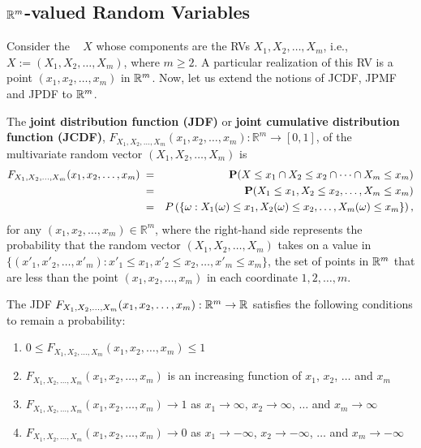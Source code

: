\subsection{$\mathbb{R}^m$-valued Random Variables}\label{S:Rm-valuedRVs}

Consider the \rv~ $X$ whose components are the RVs $X_1,X_2,\ldots,X_m$, i.e., $X := (X_1,X_2,\ldots,X_m)$, where $m \geq 2$.  
A particular realization of this RV is a point $(x_1,x_2,\ldots,x_m)$ in $\mathbb{R}^m$.  
Now, let us extend the notions of JCDF, JPMF and JPDF to $\mathbb{R}^m$.  

\begin{definition}\label{Df:JmDF}
The {\bf joint distribution function (JDF)} or {\bf joint cumulative distribution function (JCDF)}, $F_{X_1,X_2,\ldots,X_m}(x_1,x_2,\ldots,x_m):\mathbb{R}^m\to [0,1]$, of the multivariate random vector $(X_1,X_2,\ldots,X_m)$ is
\begin{eqnarray}\label{E:jmDF}
F_{X_1,X_2,\ldots,X_m}(x_1,x_2,\ldots,x_m)\; 
&=& \mathbf{P}(X\leq x_1 \cap X_2 \leq x_2 \cap \cdots \cap X_m \leq x_m)\notag\\ 
&=& \mathbf{P}(X_1\leq x_1 , X_2 \leq x_2, \ldots, X_m \leq x_m)\\
&=& P\left( \{ \omega: X_1(\omega) \leq x_1, X_2(\omega) \leq x_2, \ldots, X_m(\omega) \leq x_m \} \right), \notag
\end{eqnarray}
for any $(x_1,x_2,\ldots,x_m) \in \mathbb{R}^m$, 
where the right-hand side represents the probability that the random vector $(X_1,X_2,\ldots,X_m)$ takes on a value in 
$\{(x'_1,x'_2,\ldots,x'_m): x'_1 \leq x_1, x'_2 \leq x_2, \ldots, x'_m \leq x_m\}$, the set of points in $\mathbb{R}^m$ that are less than the point $(x_1,x_2,\ldots,x_m)$ in each coordinate $1,2,\ldots,m$.
\end{definition}

The JDF $F_{X_1,X_2,\ldots,X_m}(x_1,x_2,\ldots,x_m):\mathbb{R}^m\to\mathbb{R}$ satisfies the following conditions to remain a probability: 
\begin{enumerate}
\item $0 \leq F_{X_1,X_2,\ldots,X_m}(x_1,x_2,\ldots,x_m) \leq 1$
\item $F_{X_1,X_2,\ldots,X_m}(x_1,x_2,\ldots,x_m)$ is an increasing function of $x_1$, $x_2$, $\ldots$ and $x_m$
\item $F_{X_1,X_2,\ldots,X_m}(x_1,x_2,\ldots,x_m) \to 1$ as $x_1\to \infty$, $x_2\to \infty$, $\ldots$ and $x_m\to \infty$
\item $F_{X_1,X_2,\ldots,X_m}(x_1,x_2,\ldots,x_m) \to 0$ as $x_1\to -\infty$, $x_2\to -\infty$, $\ldots$ and $x_m\to -\infty$
\end{enumerate}

